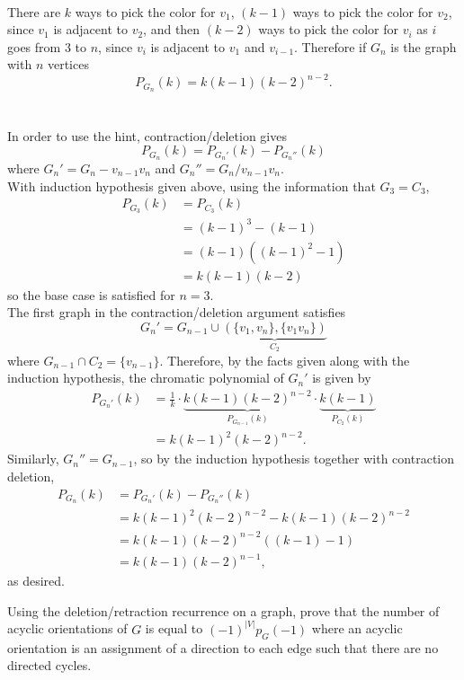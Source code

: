 \documentclass{article}
\newenvironment{problem}[2][Problem]{\begin{trivlist}
\item[\hskip \labelsep {\bfseries #1}\hskip \labelsep {\bfseries #2.}]}{\end{trivlist}}
\newenvironment{solution}[1][Solution.]{\begin{trivlist}
\item[\hskip \labelsep {\bfseries #1}]}{\end{trivlist}}
\newcommand{\set}[1]{\{ #1 \}}
\begin{document}
\begin{solution} \text{} \\
  There are $k$ ways
  to pick the color for $v_1$, $(k-1)$ ways to pick the color for $v_2$, since
  $v_1$ is adjacent to $v_2$, and then $(k-2)$ ways to pick the color for $v_i$
  as $i$ goes from $3$ to $n$, since $v_i$ is adjacent to $v_1$ and $v_{i-1}$.
  Therefore if $G_n$ is the graph with $n$ vertices \[
    P_{G_n}(k) = k(k-1)(k-2)^{n-2}.
  \]
  \\~\\
  In order to use the hint, contraction/deletion gives \[
    P_{G_n}(k) = P_{G_n'}(k) - P_{G_n''}(k)
  \] where $G_n' = G_n - v_{n-1}v_n$ and $G_n'' = G_n/v_{n-1}v_n$.
  \\
  With induction hypothesis given above, using the information that $G_3 = C_3$,
  \begin{align*}
    P_{G_3}(k)
    &= P_{C_3}(k) \\
    &= (k-1)^3 - (k-1) \\
    &= (k-1)((k-1)^2 - 1) \\
    &= k(k-1)(k-2)
  \end{align*} so the base case is satisfied for $n=3$.
  \\
  The first graph in the contraction/deletion argument satisfies \[
    G_n' = G_{n-1} \cup \underbrace{(\set{v_1, v_n}, \set{v_1v_n})}_{C_2}
  \] where $G_{n-1} \cap C_2 = \set{v_{n-1}}$. Therefore, by the facts given
  along with the induction hypothesis, the chromatic
  polynomial of $G_n'$ is given by \begin{align*}
    P_{G_n'}(k)
    &= \frac 1k
      \cdot \underbrace{k(k-1)(k-2)^{n-2}}_{\displaystyle P_{G_{n-1}}(k)}
      \cdot \underbrace{k(k-1)}_{\displaystyle P_{C_2}(k)} \\
    &= k(k-1)^2(k-2)^{n-2}.
  \end{align*}
  Similarly, $G_n'' = G_{n-1}$, so by the induction hypothesis together with
  contraction deletion, \begin{align*}
    P_{G_n}(k) &= P_{G_n'}(k) - P_{G_n''}(k) \\
      &= k(k-1)^2(k-2)^{n-2} - k(k-1)(k-2)^{n-2} \\
      &= k(k-1)(k-2)^{n-2} ((k-1) - 1) \\
      &= k(k-1)(k-2)^{n-1},
  \end{align*} as desired.
\end{solution}
\pagebreak
\begin{problem}{3}
  Using the deletion/retraction recurrence on a graph, prove that the number of
  acyclic orientations of $G$ is equal to $(-1)^{|V|}p_G(-1)$ where an acyclic
  orientation is an assignment of a direction to each edge such that there are
  no directed cycles.
\end{problem}
\end{document}
